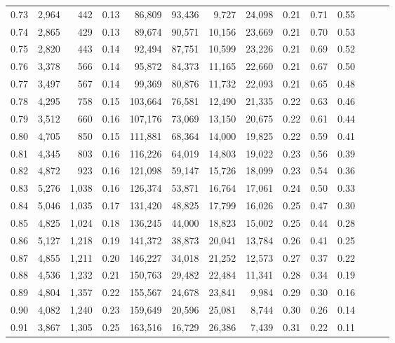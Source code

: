 \begin{tabular}{rrrrrrrrrrrrrr}
0.73 &  2,964 &    442 &  0.13 &   86,809 &   93,436 &   9,727 &  24,098 &  0.21 &  0.71 &      0.55 \\
0.74 &  2,865 &    429 &  0.13 &   89,674 &   90,571 &  10,156 &  23,669 &  0.21 &  0.70 &      0.53 \\
0.75 &  2,820 &    443 &  0.14 &   92,494 &   87,751 &  10,599 &  23,226 &  0.21 &  0.69 &      0.52 \\
0.76 &  3,378 &    566 &  0.14 &   95,872 &   84,373 &  11,165 &  22,660 &  0.21 &  0.67 &      0.50 \\
0.77 &  3,497 &    567 &  0.14 &   99,369 &   80,876 &  11,732 &  22,093 &  0.21 &  0.65 &      0.48 \\
0.78 &  4,295 &    758 &  0.15 &  103,664 &   76,581 &  12,490 &  21,335 &  0.22 &  0.63 &      0.46 \\
0.79 &  3,512 &    660 &  0.16 &  107,176 &   73,069 &  13,150 &  20,675 &  0.22 &  0.61 &      0.44 \\
0.80 &  4,705 &    850 &  0.15 &  111,881 &   68,364 &  14,000 &  19,825 &  0.22 &  0.59 &      0.41 \\
0.81 &  4,345 &    803 &  0.16 &  116,226 &   64,019 &  14,803 &  19,022 &  0.23 &  0.56 &      0.39 \\
0.82 &  4,872 &    923 &  0.16 &  121,098 &   59,147 &  15,726 &  18,099 &  0.23 &  0.54 &      0.36 \\
0.83 &  5,276 &  1,038 &  0.16 &  126,374 &   53,871 &  16,764 &  17,061 &  0.24 &  0.50 &      0.33 \\
0.84 &  5,046 &  1,035 &  0.17 &  131,420 &   48,825 &  17,799 &  16,026 &  0.25 &  0.47 &      0.30 \\
0.85 &  4,825 &  1,024 &  0.18 &  136,245 &   44,000 &  18,823 &  15,002 &  0.25 &  0.44 &      0.28 \\
0.86 &  5,127 &  1,218 &  0.19 &  141,372 &   38,873 &  20,041 &  13,784 &  0.26 &  0.41 &      0.25 \\
0.87 &  4,855 &  1,211 &  0.20 &  146,227 &   34,018 &  21,252 &  12,573 &  0.27 &  0.37 &      0.22 \\
0.88 &  4,536 &  1,232 &  0.21 &  150,763 &   29,482 &  22,484 &  11,341 &  0.28 &  0.34 &      0.19 \\
0.89 &  4,804 &  1,357 &  0.22 &  155,567 &   24,678 &  23,841 &   9,984 &  0.29 &  0.30 &      0.16 \\
0.90 &  4,082 &  1,240 &  0.23 &  159,649 &   20,596 &  25,081 &   8,744 &  0.30 &  0.26 &      0.14 \\
0.91 &  3,867 &  1,305 &  0.25 &  163,516 &   16,729 &  26,386 &   7,439 &  0.31 &  0.22 &      0.11 \\

\end{tabular}
